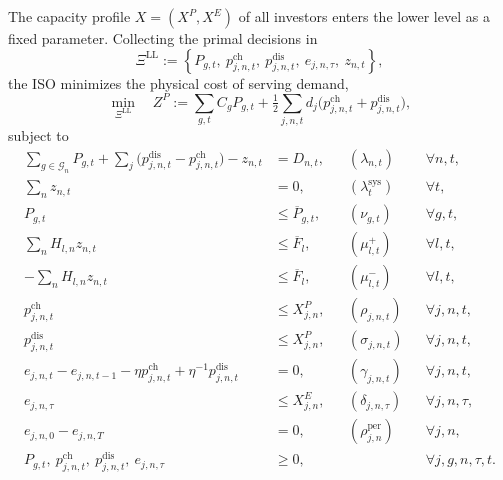 \documentclass[11pt,a4paper,fleqn]{article}
\numberwithin{equation}{section}
\begin{document}
The capacity profile $X=(X^P,X^E)$ of all investors enters the lower level as
a fixed parameter. Collecting the primal decisions in
\begin{equation}\label{eq:llp-variables}
\Xi^{\mathrm{LL}}
:=\left\{P_{g,t},\ p^{\mathrm{ch}}_{j,n,t},\ p^{\mathrm{dis}}_{j,n,t},\
e_{j,n,\tau},\ z_{n,t}\right\},
\end{equation}
the ISO minimizes the physical cost of serving demand,
\begin{equation}\label{eq:llp-objective}
\min_{\Xi^{\mathrm{LL}}}\quad
Z^P:=\sum_{g,t}C_gP_{g,t}
+\tfrac{1}{2}\sum_{j,n,t}d_j
\bigl(p^{\mathrm{ch}}_{j,n,t}+p^{\mathrm{dis}}_{j,n,t}\bigr),
\end{equation}
subject to
\begin{subequations}\label{eq:llp-constraints}
\begin{align}
\sum_{g\in\mathcal G_n}P_{g,t}
+\sum_j\bigl(p^{\mathrm{dis}}_{j,n,t}-p^{\mathrm{ch}}_{j,n,t}\bigr)
-z_{n,t}
&=D_{n,t},
&& (\lambda_{n,t})
&& \forall n,t,
\label{eq:nodal-balance}\\
\sum_n z_{n,t}
&=0,
&& (\lambda^{\mathrm{sys}}_t)
&& \forall t,
\label{eq:system-balance}\\
P_{g,t}
&\leq\overline P_{g,t},
&& (\nu_{g,t})
&& \forall g,t,
\label{eq:generation-bound}\\
\sum_n H_{l,n}z_{n,t}
&\leq\overline F_l,
&& (\mu^+_{l,t})
&& \forall l,t,
\label{eq:line-forward}\\
-\sum_n H_{l,n}z_{n,t}
&\leq\overline F_l,
&& (\mu^-_{l,t})
&& \forall l,t,
\label{eq:line-reverse}\\
p^{\mathrm{ch}}_{j,n,t}
&\leq X^P_{j,n},
&& (\rho_{j,n,t})
&& \forall j,n,t,
\label{eq:charge-bound}\\
p^{\mathrm{dis}}_{j,n,t}
&\leq X^P_{j,n},
&& (\sigma_{j,n,t})
&& \forall j,n,t,
\label{eq:discharge-bound}\\
e_{j,n,t}-e_{j,n,t-1}
-\eta p^{\mathrm{ch}}_{j,n,t}
+\eta^{-1}p^{\mathrm{dis}}_{j,n,t}
&=0,
&& (\gamma_{j,n,t})
&& \forall j,n,t,
\label{eq:soc-transition}\\
e_{j,n,\tau}
&\leq X^E_{j,n},
&& (\delta_{j,n,\tau})
&& \forall j,n,\tau,
\label{eq:soc-bound}\\
e_{j,n,0}-e_{j,n,T}
&=0,
&& (\rho^{\mathrm{per}}_{j,n})
&& \forall j,n,
\label{eq:soc-periodicity}\\
P_{g,t},\ p^{\mathrm{ch}}_{j,n,t},\
p^{\mathrm{dis}}_{j,n,t},\ e_{j,n,\tau}
&\geq 0,
&&
&& \forall j,g,n,\tau,t.
\label{eq:llp-nonnegativity}
\end{align}
\end{subequations}
\end{document}
